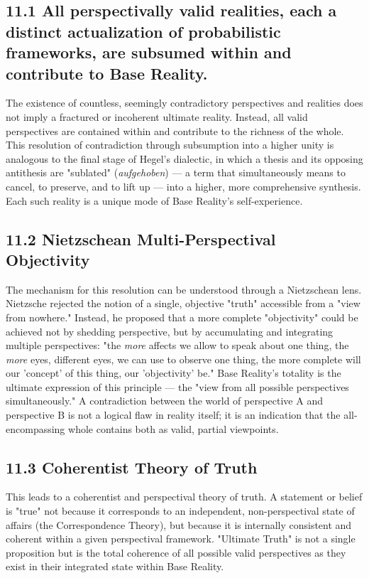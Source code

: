 \subsection*{11.1 All perspectivally valid realities, each a distinct actualization of probabilistic frameworks, are subsumed within and contribute to Base Reality.}


The existence of countless, seemingly contradictory perspectives and realities does not imply a fractured or incoherent ultimate reality. Instead, all valid perspectives are contained within and contribute to the richness of the whole. This resolution of contradiction through subsumption into a higher unity is analogous to the final stage of Hegel's dialectic, in which a thesis and its opposing antithesis are "sublated" (\textit{aufgehoben}) — a term that simultaneously means to cancel, to preserve, and to lift up — into a higher, more comprehensive synthesis. Each such reality is a unique mode of Base Reality's self-experience.


\subsection*{11.2 Nietzschean Multi-Perspectival Objectivity}


The mechanism for this resolution can be understood through a Nietzschean lens. Nietzsche rejected the notion of a single, objective "truth" accessible from a "view from nowhere." Instead, he proposed that a more complete "objectivity" could be achieved not by shedding perspective, but by accumulating and integrating multiple perspectives: "the \textit{more} affects we allow to speak about one thing, the \textit{more} eyes, different eyes, we can use to observe one thing, the more complete will our 'concept' of this thing, our 'objectivity' be." Base Reality's totality is the ultimate expression of this principle — the "view from all possible perspectives simultaneously." A contradiction between the world of perspective A and perspective B is not a logical flaw in reality itself; it is an indication that the all-encompassing whole contains both as valid, partial viewpoints.


\subsection*{11.3 Coherentist Theory of Truth}


This leads to a coherentist and perspectival theory of truth. A statement or belief is "true" not because it corresponds to an independent, non-perspectival state of affairs (the Correspondence Theory), but because it is internally consistent and coherent within a given perspectival framework. "Ultimate Truth" is not a single proposition but is the total coherence of all possible valid perspectives as they exist in their integrated state within Base Reality.


